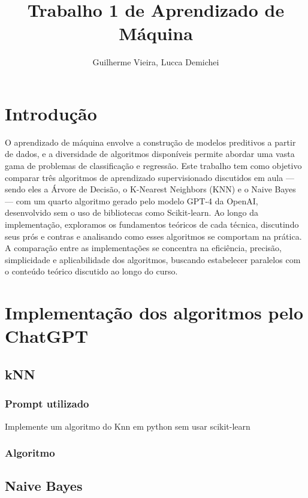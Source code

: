 \documentclass[12pt]{article}
\title{Trabalho 1 de Aprendizado de Máquina}
\author{Guilherme Vieira, Lucca Demichei\inst{1}}
\begin{document}
 
	\maketitle
	\begin{resumo} 
	\end{resumo}
 
\section{Introdução}

\label{sec:introducao}
 
O aprendizado de máquina envolve a construção de modelos preditivos a partir de dados, e a diversidade de algoritmos disponíveis permite abordar uma vasta gama de problemas de classificação e regressão. Este trabalho tem como objetivo comparar três algoritmos de aprendizado supervisionado discutidos em aula — sendo eles a Árvore de Decisão, o K-Nearest Neighbors (KNN) e o Naive Bayes — com um quarto algoritmo gerado pelo modelo GPT-4 da OpenAI, desenvolvido sem o uso de bibliotecas como Scikit-learn. Ao longo da implementação, exploramos os fundamentos teóricos de cada técnica, discutindo seus prós e contras e analisando como esses algoritmos se comportam na prática. A comparação entre as implementações se concentra na eficiência, precisão, simplicidade e aplicabilidade dos algoritmos, buscando estabelecer paralelos com o conteúdo teórico discutido ao longo do curso.



\section{Implementação dos algoritmos pelo ChatGPT}
\label{sec:implementacao}

\subsection{kNN}
\subsubsection{Prompt utilizado}
Implemente um algoritmo do Knn em python sem usar scikit-learn
\subsubsection{Algoritmo}


\subsection{Naive Bayes}
\end{document}
